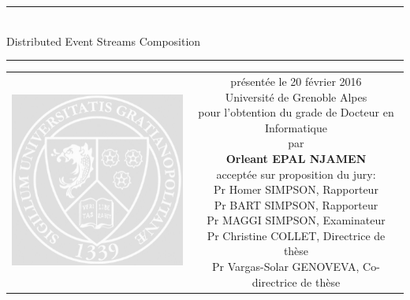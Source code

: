 \begin{titlepage}
\begin{center}
\sffamily


\null\vspace{2cm}
{\color{blue}\rule{\linewidth}{2pt}}\\
\vspace{0.5cm}
{\huge Distributed Event Streams Composition} \\[24pt] 
{\color{blue}\rule{\linewidth}{2pt}}
    
\vfill

\begin{tabular} {cc}
\parbox{0.3\textwidth}{\includegraphics[scale=0.60]{images/UDG}}
 &
 \parbox{0.7\textwidth}{%
  	présentée le 20 février 2016\\
 	Université de Grenoble Alpes\\[6pt]
 	pour l'obtention du grade de Docteur en Informatique\\
  	par\\ [4pt]
  	\null \hspace{3em} {\color{blue} \textbf{Orleant EPAL NJAMEN}}\\[9pt]
   \small
  acceptée sur proposition du jury:\\[4pt]
  Pr Homer SIMPSON, Rapporteur\\
  Pr BART SIMPSON, Rapporteur\\
  Pr MAGGI SIMPSON, Examinateur\\
  Pr Christine COLLET, Directrice de thèse\\
  Pr Vargas-Solar GENOVEVA, Co-directrice de thèse\\[12pt]
 }
\end{tabular}
\end{center}
\vspace{2cm}
\end{titlepage}



